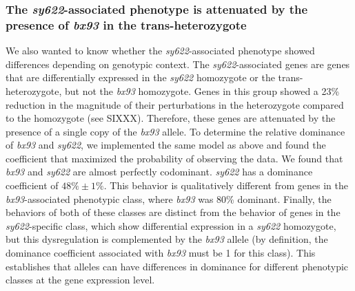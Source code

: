 \documentclass[10pt, onecolumn]{article}
\begin{document}
\subsubsection*{The \emph{sy622}-associated phenotype is attenuated by the presence
            of \emph{bx93} in the trans-heterozygote}
We also wanted to know whether the \emph{sy622}-associated phenotype showed
differences depending on genotypic context. The \emph{sy622}-associated genes
are genes that are differentially expressed in the \emph{sy622} homozygote or
the trans-heterozygote, but not the \emph{bx93} homozygote. Genes in this group
showed a 23\% reduction in the magnitude of their perturbations in the
heterozygote compared to the homozygote (see
SIXXX). Therefore, these genes are attenuated by
the presence of a single copy of the \emph{bx93} allele. To determine the
relative dominance of \emph{bx93} and \emph{sy622}, we implemented the same model
as above and found the coefficient that maximized the probability of observing
the data. We found that \emph{bx93} and \emph{sy622} are almost perfectly
codominant. \emph{sy622} has a dominance coefficient of $48\% \pm 1\%$.
This behavior is qualitatively different from genes in the
\emph{bx93}-associated phenotypic class, where \emph{bx93}
was 80\% dominant. Finally, the behaviors of both of these classes are distinct
from the behavior of genes in the \emph{sy622}-specific class, which show
differential expression in a \emph{sy622} homozygote, but this dysregulation is
complemented by the \emph{bx93} allele (by definition, the dominance coefficient
associated with \emph{bx93} must be 1 for this class). This establishes that
alleles can have differences in dominance for different phenotypic classes at
the gene expression level.
\end{document}
